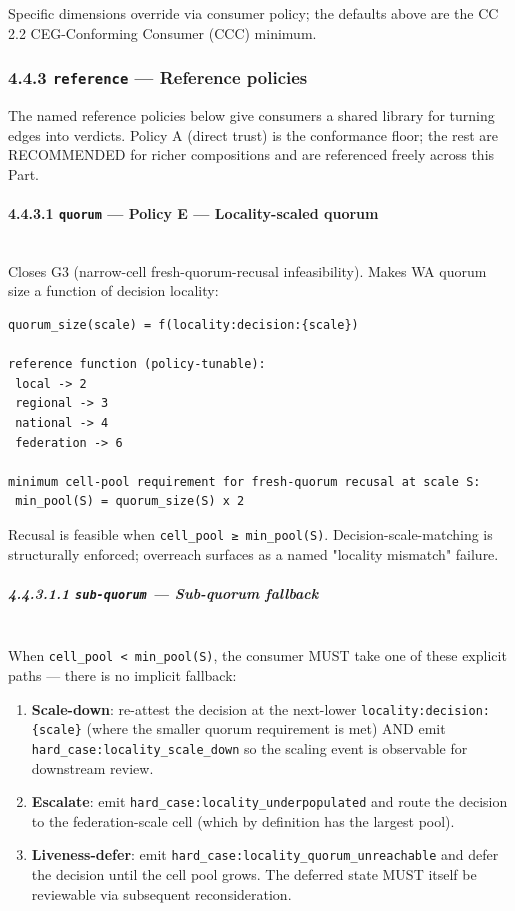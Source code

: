 \documentclass[11pt]{article}
\begin{document}
Specific dimensions override via consumer policy; the defaults above are the CC 2.2 CEG-Conforming Consumer (CCC) minimum.


\subsubsection*{4.4.3 \texttt{reference} — Reference policies}


The named reference policies below give consumers a shared library for turning edges into verdicts. Policy A (direct trust) is the conformance floor; the rest are RECOMMENDED for richer compositions and are referenced freely across this Part.


\paragraph{4.4.3.1 \texttt{quorum} — Policy E — Locality-scaled quorum}\mbox{}\\


Closes G3 (narrow-cell fresh-quorum-recusal infeasibility). Makes WA quorum size a function of decision locality:


\begin{lstlisting}
quorum_size(scale) = f(locality:decision:{scale})

reference function (policy-tunable):
 local -> 2
 regional -> 3
 national -> 4
 federation -> 6

minimum cell-pool requirement for fresh-quorum recusal at scale S:
 min_pool(S) = quorum_size(S) x 2
\end{lstlisting}

Recusal is feasible when \texttt{cell\_pool ≥ min\_pool(S)}. Decision-scale-matching is structurally enforced; overreach surfaces as a named "locality mismatch" failure.


\subparagraph{4.4.3.1.1 \texttt{sub-quorum} — Sub-quorum fallback}\mbox{}\\


When \texttt{cell\_pool < min\_pool(S)}, the consumer MUST take one of these explicit paths — there is no implicit fallback:


\begin{enumerate}\setlength\itemsep{0pt}
\item \textbf{Scale-down}: re-attest the decision at the next-lower \texttt{locality:decision:\{scale\}} (where the smaller quorum requirement is met) AND emit \texttt{hard\_case:locality\_scale\_down} so the scaling event is observable for downstream review.
\item \textbf{Escalate}: emit \texttt{hard\_case:locality\_underpopulated} and route the decision to the federation-scale cell (which by definition has the largest pool).
\item \textbf{Liveness-defer}: emit \texttt{hard\_case:locality\_quorum\_unreachable} and defer the decision until the cell pool grows. The deferred state MUST itself be reviewable via subsequent reconsideration.
\end{enumerate}
\end{document}
